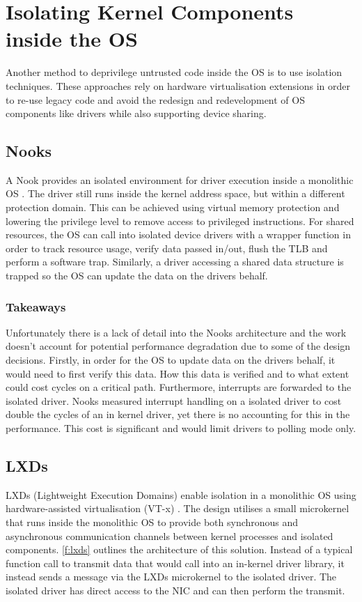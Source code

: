 \section{Isolating Kernel Components inside the OS}\label{s:isolation_dd}
Another method to deprivilege untrusted code inside the OS is to use isolation techniques. These approaches
rely on hardware virtualisation extensions in order to re-use legacy code and avoid the redesign and redevelopment
of OS components like drivers while also supporting device sharing.

\subsection{Nooks}
A Nook provides an isolated environment for driver execution inside a monolithic OS \cite{Swift_MLE_02}. The
driver still runs inside the kernel address space, but within a different protection domain. This can be achieved
using virtual memory protection and lowering the privilege level to remove access to privileged instructions. 
For shared resources, the OS can call into isolated device drivers with a wrapper function in order to track 
resource usage, verify data passed in/out, flush the TLB and perform a software trap. Similarly, a driver
accessing a shared data structure is trapped so the OS can update the data on the drivers behalf.

\subsubsection{Takeaways}
Unfortunately there is a lack of detail into the Nooks architecture and the work doesn't account for potential 
performance degradation due to some of the design decisions. Firstly, in order for the OS to update data on the drivers
behalf, it would need to first verify this data. How this data is verified and to what extent could cost cycles on a 
critical path. Furthermore, interrupts are forwarded to the isolated driver. Nooks measured 
interrupt handling on a isolated driver to cost double the cycles of an in kernel driver, yet 
there is no accounting for this in the performance. This cost is significant and would limit drivers to polling
mode only.

\subsection{{LXDs}}
LXDs (Lightweight Execution Domains) enable isolation in a monolithic OS using hardware-assisted virtualisation
(VT-x) \cite{Narayanan_BJSBQ_19}. The design utilises a small microkernel that runs inside the monolithic OS to
provide both synchronous and asynchronous communication channels between kernel processes and isolated components.
\autoref{f:lxds} outlines the architecture of this solution. Instead of a typical function call to transmit data 
that would call into an in-kernel driver library, it instead sends a message via the LXDs microkernel to the
isolated driver. The isolated driver has direct access to the NIC and can then perform the transmit. 

